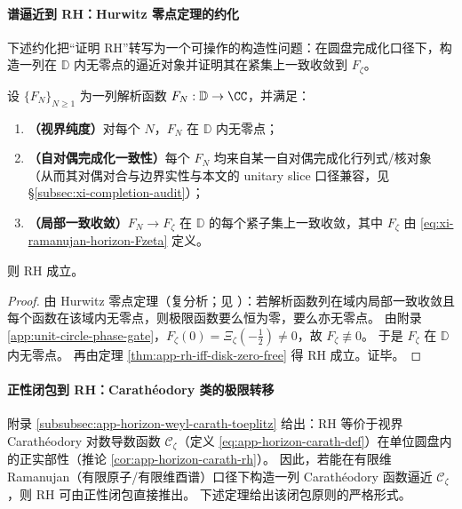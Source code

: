 \paragraph{谱逼近到 RH：Hurwitz 零点定理的约化}
下述约化把“证明 RH”转写为一个可操作的构造性问题：在圆盘完成化口径下，构造一列在 \(\mathbb{D}\) 内无零点的逼近对象并证明其在紧集上一致收敛到 \(F_{\zeta}\)。

\begin{theorem}\label{thm:xi-hurwitz-horizon-reduction}
设 \(\{F_N\}_{N\ge 1}\) 为一列解析函数 \(F_N:\mathbb{D}\to\CC\)，并满足：
\begin{enumerate}
  \item \textbf{（视界纯度）}对每个 \(N\)，\(F_N\) 在 \(\mathbb{D}\) 内无零点；
  \item \textbf{（自对偶完成化一致性）}每个 \(F_N\) 均来自某一自对偶完成化行列式/核对象（从而其对偶对合与边界实性与本文的 unitary slice 口径兼容，见 \S\ref{subsec:xi-completion-audit}）；
  \item \textbf{（局部一致收敛）}\(F_N\to F_{\zeta}\) 在 \(\mathbb{D}\) 的每个紧子集上一致收敛，其中 \(F_{\zeta}\) 由 \eqref{eq:xi-ramanujan-horizon-Fzeta} 定义。
\end{enumerate}
则 RH 成立。
\end{theorem}

\begin{proof}
由 Hurwitz 零点定理（复分析；见 \cite[Chapter~4]{Ahlfors1979ComplexAnalysis}）：若解析函数列在域内局部一致收敛且每个函数在该域内无零点，则极限函数要么恒为零，要么亦无零点。
由附录 \ref{app:unit-circle-phase-gate}，\(F_{\zeta}(0)=\Xi_{\zeta}(-\tfrac12)\neq 0\)，故 \(F_{\zeta}\not\equiv 0\)。
于是 \(F_{\zeta}\) 在 \(\mathbb{D}\) 内无零点。
再由定理 \ref{thm:app-rh-iff-disk-zero-free} 得 RH 成立。证毕。
\end{proof}

\paragraph{正性闭包到 RH：Carath\'eodory 类的极限转移}
附录 \ref{subsubsec:app-horizon-weyl-carath-toeplitz} 给出：RH 等价于视界 Carath\'eodory 对数导数函数 \(\mathscr{C}_{\zeta}\)（定义 \eqref{eq:app-horizon-carath-def}）在单位圆盘内的正实部性（推论 \ref{cor:app-horizon-carath-rh}）。
因此，若能在有限维 Ramanujan（有限原子/有限维酉谱）口径下构造一列 Carath\'eodory 函数逼近 \(\mathscr{C}_{\zeta}\)，则 RH 可由正性闭包直接推出。
下述定理给出该闭包原则的严格形式。

